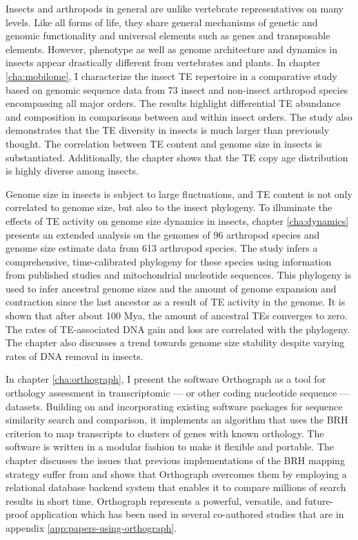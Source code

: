 Insects and arthropods in general are unlike vertebrate representatives
on many levels. Like all forms of life, they share general mechanisms of
genetic and genomic functionality and universal elements such as genes
and transposable elements. However, phenotype as well as genome
architecture and dynamics in insects appear drastically different from
vertebrates and plants. In chapter \ref{cha:mobilome}, I characterize
the insect TE repertoire in a comparative study based on genomic
sequence data from 73 insect and non-insect arthropod species
encompassing all major orders. The results highlight differential TE
abundance and composition in comparisons between and within insect
orders. The study also demonstrates that the TE diversity in insects is
much larger than previously thought. The correlation between TE content
and genome size in insects is substantiated. Additionally, the chapter
shows that the TE copy age distribution is highly diverse among insects.

Genome size in insects is subject to large fluctuations, and TE content
is not only correlated to genome size, but also to the insect phylogeny.
To illuminate the effects of TE activity on genome size dynamics in
insects, chapter \ref{cha:dynamics} presents an extended analysis on the
genomes of 96 arthropod species and genome size estimate data from 613
arthropod species. The study infers a comprehensive, time-calibrated
phylogeny for these species using information from published studies and
mitochondrial nucleotide sequences. This phylogeny is used to infer
ancestral genome sizes and the amount of genome expansion and
contraction since the last ancestor as a result of TE activity in the
genome. It is shown that after about 100 Mya, the amount of ancestral
TEs converges to zero. The rates of TE-associated DNA gain and loss are
correlated with the phylogeny. The chapter also discusses a trend
towards genome size stability despite varying rates of DNA removal in
insects.

In chapter \ref{cha:orthograph}, I present the software Orthograph as a
tool for orthology assessment in transcriptomic --- or other coding
nucleotide sequence --- datasets. Building on and incorporating existing
software packages for sequence similarity search and comparison, it
implements an algorithm that uses the BRH criterion to map transcripts
to clusters of genes with known orthology. The software is written in a
modular fashion to make it flexible and portable. The chapter discusses the
issues that previous implementations of the BRH mapping strategy suffer
from and shows that Orthograph overcomes them by employing a relational
database backend system that enables it to compare millions of search
results in short time. Orthograph represents a powerful, versatile, and
future-proof application which has been used in several co-authored
studies \citep{Mayer2016, Pauli2016, Bank2017, Dowling2017, Peters2017,
Gillung2018, Johnson2018} that are in appendix
\ref{app:papers-using-orthograph}.

